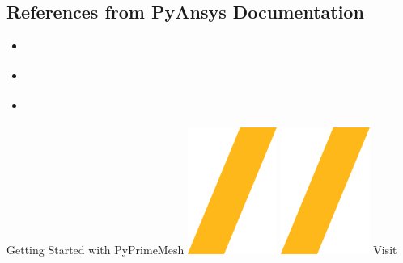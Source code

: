 \documentclass[9pt,landscape]{article}
\begin{document}
\begin{multicols}{3}

\subsection{References from PyAnsys Documentation}
\begin{itemize}
\item \href{https://prime.docs.pyansys.com/version/stable/getting_started/index.html}{\color{blue}{PyPrimeMesh - Getting Started}}
\item \href{https://prime.docs.pyansys.com/version/stable/user_guide/index.html}{\color{blue}{PyPrimeMesh - User guide}}
\item \href{https://prime.docs.pyansys.com/version/stable/examples/index.html}{\color{blue}{PyPrimeMesh - Examples}}
\end{itemize}
\end{multicols}

\vspace{-0.15cm}
\noindent\makebox[\linewidth]{\rule{\paperwidth}{4pt}}
\begin{center}
Getting Started with PyPrimeMesh \includegraphics[height=\fontcharht\font`\S]{slash.png} \href{https://github.com/ansys/pyprimemesh}{\color{blue}{PyPrimeMesh on GitHub}} \includegraphics[height=\fontcharht\font`\S]{slash.png} Visit 
\end{center}
\end{document}
